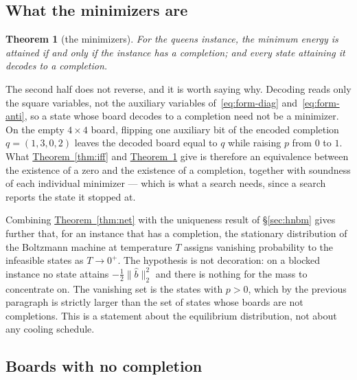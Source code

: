 \documentclass{easychair}
\newtheorem{thm}{Theorem}[section]
\newcommand{\secref}[1]{\hyperref[#1]{\textcolor{academicpurple}{\S\ref*{#1}}}}
\newcommand{\thmref}[1]{\textcolor{academicpurple}{\hyperref[#1]{Theorem~\ref*{#1}}}}
\begin{document}
\subsection{What the minimizers are}\label{sec:min}

\begin{thm}[the minimizers]\label{thm:min}
For the queens instance, the minimum energy is attained if and only if the instance has a completion;
and every state attaining it decodes to a completion.
\end{thm}

The second half does not reverse, and it is worth saying why. Decoding reads only the square
variables, not the auxiliary variables of~\eqref{eq:form-diag} and~\eqref{eq:form-anti}, so a state
whose board decodes to a completion need not be a minimizer. On the empty $4\times4$ board, flipping
one auxiliary bit of the encoded completion $q = (1,3,0,2)$ leaves the decoded board equal to $q$
while raising $p$ from $0$ to $1$. What \thmref{thm:iff} and \thmref{thm:min} give is therefore an
equivalence between the existence of a zero and the existence of a completion, together with
soundness of each individual minimizer --- which is what a search needs, since a search reports the
state it stopped at.

Combining \thmref{thm:net} with the uniqueness result of \secref{sec:hnbm} gives further that, for an
instance that has a completion, the stationary distribution of the Boltzmann machine at temperature
$T$ assigns vanishing probability to the infeasible states as $T \to 0^{+}$. The hypothesis is not
decoration: on a blocked instance no state attains $-\tfrac12\lVert\hat b\rVert_2^2$ and there is
nothing for the mass to concentrate on. The vanishing set is the states with $p > 0$, which by the
previous paragraph is strictly larger than the set of states whose boards are not completions. This is
a statement about the equilibrium distribution, not about any cooling schedule.

\subsection{Boards with no completion}\label{sec:blocked}
\end{document}
